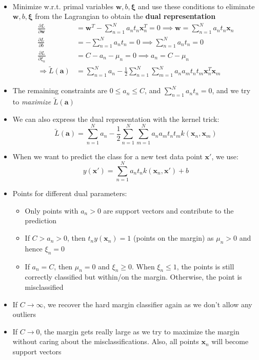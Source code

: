 \begin{itemize}
\begin{equation*}
\begin{split}
		\end{split}
	\end{equation*}
	\item Minimize w.r.t. primal variables $\bm{w}, b, \bm{\xi}$ and use these conditions to eliminate $\bm{w}, b, \bm{\xi}$ from the Lagrangian to obtain the \textbf{dual representation}
	\begin{equation*}
		\begin{split}
			\frac{\partial L}{\partial \bm{w}} & = \bm{w}^T - \sum\limits_{n=1}^{N} a_n t_n \bm{x}_n^T = 0 \implies \bm{w} = \sum\limits_{n=1}^{N} a_n t_n \bm{x}_n\\
			\frac{\partial L}{\partial b} & = - \sum\limits_{n=1}^{N} a_n t_n = 0 \implies \sum\limits_{n=1}^{N} a_n t_n = 0\\
			\frac{\partial L}{\partial \xi_n} & = C - a_n - \mu_n = 0 \implies a_n  = C - \mu_n\\
			\Rightarrow \tilde{L}(\bm{a}) & = \sum\limits_{n=1}^{N} a_n - \frac{1}{2}  \sum\limits_{n=1}^{N}  \sum\limits_{m=1}^{N} a_n a_m t_n t_m \bm{x}_n^T \bm{x}_m
		\end{split}
	\end{equation*}
	\item The remaining constraints are $0\leq a_n \leq C$, and $\sum\limits_{n=1}^{N} a_n t_n = 0$, and we try to \textit{maximize} $\tilde{L}(\bm{a})$
	\item We can also express the dual representation with the kernel trick:
	$$\tilde{L}(\bm{a}) = \sum\limits_{n=1}^{N} a_n - \frac{1}{2}  \sum\limits_{n=1}^{N}  \sum\limits_{m=1}^{N} a_n a_m t_n t_m k(\bm{x}_n, \bm{x}_m)$$
	\item When we want to predict the class for a new test data point $\bm{x}'$, we use:
	$$y(\bm{x}') = \sum\limits_{n=1}^{N} a_n t_n k(\bm{x}_n, \bm{x}') + b$$
	\item Points for different dual parameters:
	\begin{itemize}
		\item Only points with $a_n > 0$ are support vectors and contribute to the prediction
		\item If $C > a_n > 0$, then $t_n y(\bm{x}_n) = 1$ (points on the margin) as $\mu_n > 0$ and hence $\xi_n = 0$
		\item If $a_n = C$, then $\mu_n = 0$ and $\xi_n \geq 0$. When $\xi_n \leq 1$, the points is still correctly classified but within/on the margin. Otherwise, the point is misclassified
	\end{itemize}
	\item If $C\to\infty$, we recover the hard margin classifier again as we don't allow any outliers
	\item If $C\to 0$, the margin gets really large as we try to maximize the margin without caring about the misclassifications. Also, all points $\bm{x}_n$ will become support vectors 
\end{itemize}

